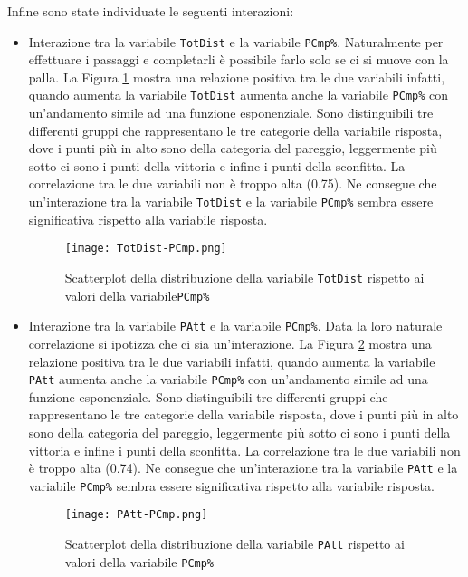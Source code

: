 Infine sono state individuate le seguenti interazioni:
\begin{itemize}
	\item Interazione tra la variabile \texttt{TotDist} e la variabile \texttt{PCmp\%}. Naturalmente per effettuare i passaggi e completarli è possibile farlo solo se ci si muove con la palla. La Figura \ref{fig:totdistpcmp} mostra una relazione positiva tra le due variabili infatti, quando aumenta la variabile \texttt{TotDist} aumenta anche la variabile \texttt{PCmp\%} con un'andamento simile ad una funzione esponenziale. Sono distinguibili tre differenti gruppi che rappresentano le tre categorie della variabile risposta, dove i punti più in alto sono della categoria del pareggio, leggermente più sotto ci sono i punti della vittoria e infine i punti della sconfitta. La correlazione tra le due variabili non è troppo alta (0.75). Ne consegue che un'interazione tra la variabile \texttt{TotDist} e la variabile \texttt{PCmp\%} sembra essere significativa rispetto alla variabile risposta.
	\begin{figure}[htbp]
		\begin{center}
			\texttt{[image: TotDist-PCmp.png]}
			\caption{Scatterplot della distribuzione della variabile \texttt{TotDist} rispetto ai valori della variabile\texttt{PCmp\%}}  \label{fig:totdistpcmp}
		\end{center}
	\end{figure}
	\item Interazione tra la variabile \texttt{PAtt} e la variabile \texttt{PCmp\%}. Data la loro naturale correlazione si ipotizza che ci sia un'interazione. La Figura \ref{fig:pp} mostra una relazione positiva tra le due variabili infatti, quando aumenta la variabile \texttt{PAtt} aumenta anche la variabile \texttt{PCmp\%} con un'andamento simile ad una funzione esponenziale. Sono distinguibili tre differenti gruppi che rappresentano le tre categorie della variabile risposta, dove i punti più in alto sono della categoria del pareggio, leggermente più sotto ci sono i punti della vittoria e infine i punti della sconfitta. La correlazione tra le due variabili non è troppo alta (0.74). Ne consegue che un'interazione tra la variabile \texttt{PAtt} e la variabile \texttt{PCmp\%} sembra essere significativa rispetto alla variabile risposta.
	\begin{figure}[htbp]
		\begin{center}
			\texttt{[image: PAtt-PCmp.png]}
			\caption{Scatterplot della distribuzione della variabile \texttt{PAtt} rispetto ai valori della variabile \texttt{PCmp\%}}  \label{fig:pp}

\end{center}
\end{figure}
\end{itemize}
